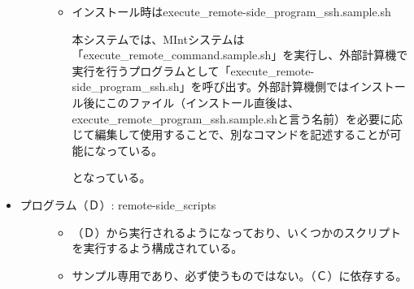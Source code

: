 \documentclass[letterpaper,10pt,dvipdfmx,openany]{sphinxmanual}
\begin{document}
\begin{itemize}
\begin{description}
\begin{itemize}
\item {} 
インストール時はexecute\_remote-side\_program\_ssh.sample.sh %
\begin{footnote}[2]\sphinxAtStartFootnote
本システムでは、MIntシステムは「execute\_remote\_command.sample.sh」を実行し、外部計算機で実行を行うプログラムとして「execute\_remote-side\_program\_ssh.sh」を呼び出す。外部計算機側ではインストール後にこのファイル（インストール直後は、execute\_remote\_program\_ssh.sample.shと言う名前）を必要に応じて編集して使用することで、別なコマンドを記述することが可能になっている。
%
\end{footnote} となっている。

\end{itemize}

\end{description}

\item {} \begin{description}
\item[{プログラム（Ｄ）: remote-side\_scripts}] \leavevmode\begin{itemize}
\item {} 
（Ｄ）から実行されるようになっており、いくつかのスクリプトを実行するよう構成されている。

\item {} 
サンプル専用であり、必ず使うものではない。（Ｃ）に依存する。

\end{itemize}

\end{description}

\end{itemize}
\end{document}
